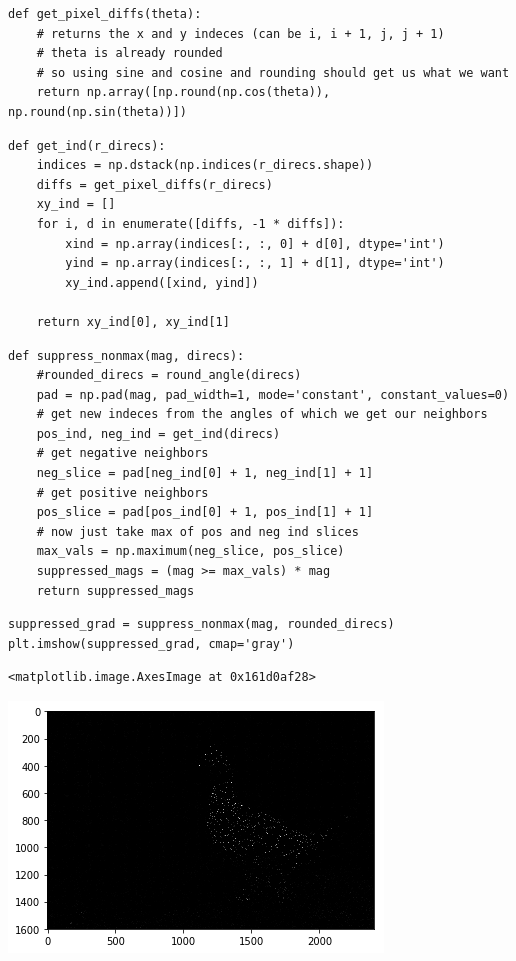 \documentclass[11pt]{article}
\begin{document}
\begin{verbatim}
def get_pixel_diffs(theta):
    # returns the x and y indeces (can be i, i + 1, j, j + 1)
    # theta is already rounded
    # so using sine and cosine and rounding should get us what we want
    return np.array([np.round(np.cos(theta)), np.round(np.sin(theta))])
\end{verbatim}


\begin{verbatim}
def get_ind(r_direcs):
    indices = np.dstack(np.indices(r_direcs.shape))
    diffs = get_pixel_diffs(r_direcs)
    xy_ind = []
    for i, d in enumerate([diffs, -1 * diffs]):
        xind = np.array(indices[:, :, 0] + d[0], dtype='int')
        yind = np.array(indices[:, :, 1] + d[1], dtype='int')
        xy_ind.append([xind, yind])
        
    return xy_ind[0], xy_ind[1]
\end{verbatim}


\begin{verbatim}
def suppress_nonmax(mag, direcs):
    #rounded_direcs = round_angle(direcs)
    pad = np.pad(mag, pad_width=1, mode='constant', constant_values=0)
    # get new indeces from the angles of which we get our neighbors
    pos_ind, neg_ind = get_ind(direcs)
    # get negative neighbors
    neg_slice = pad[neg_ind[0] + 1, neg_ind[1] + 1]
    # get positive neighbors
    pos_slice = pad[pos_ind[0] + 1, pos_ind[1] + 1]
    # now just take max of pos and neg ind slices
    max_vals = np.maximum(neg_slice, pos_slice)
    suppressed_mags = (mag >= max_vals) * mag
    return suppressed_mags
\end{verbatim}



\begin{verbatim}
suppressed_grad = suppress_nonmax(mag, rounded_direcs)
plt.imshow(suppressed_grad, cmap='gray')
\end{verbatim}

\begin{verbatim}
<matplotlib.image.AxesImage at 0x161d0af28>
\end{verbatim}
\includegraphics[width=.9\linewidth]{./obipy-resources/333BHg.png}
\end{document}
